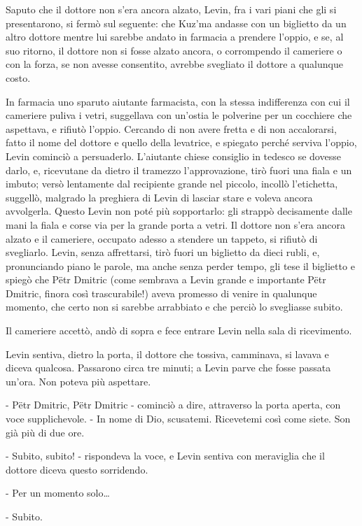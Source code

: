 Saputo che il dottore non s'era ancora alzato, Levin, fra i vari piani che gli si presentarono, si fermò sul seguente: che Kuz'ma andasse con un biglietto da un altro dottore mentre lui sarebbe andato in farmacia a prendere l'oppio, e se, al suo ritorno, il dottore non si fosse alzato ancora, o corrompendo il cameriere o con la forza, se non avesse consentito, avrebbe svegliato il dottore a qualunque costo. 

In farmacia uno sparuto aiutante farmacista, con la stessa indifferenza con cui il cameriere puliva i vetri, suggellava con un'ostia le polverine per un cocchiere che aspettava, e rifiutò l'oppio. Cercando di non avere fretta e di non accalorarsi, fatto il nome del dottore e quello della levatrice, e spiegato perché serviva l'oppio, Levin cominciò a persuaderlo. L'aiutante chiese consiglio in tedesco se dovesse darlo, e, ricevutane da dietro il tramezzo l'approvazione, tirò fuori una fiala e un imbuto; versò lentamente dal recipiente grande nel piccolo, incollò l'etichetta, suggellò, malgrado la preghiera di Levin di lasciar stare e voleva ancora avvolgerla. Questo Levin non poté più sopportarlo: gli strappò decisamente dalle mani la fiala e corse via per la grande porta a vetri. Il dottore non s'era ancora alzato e il cameriere, occupato adesso a stendere un tappeto, si rifiutò di svegliarlo. Levin, senza affrettarsi, tirò fuori un biglietto da dieci rubli, e, pronunciando piano le parole, ma anche senza perder tempo, gli tese il biglietto e spiegò che Pëtr Dmitric (come sembrava a Levin grande e importante Pëtr Dmitric, finora così trascurabile!) aveva promesso di venire in qualunque momento, che certo non si sarebbe arrabbiato e che perciò lo svegliasse subito. 

Il cameriere accettò, andò di sopra e fece entrare Levin nella sala di ricevimento. 

Levin sentiva, dietro la porta, il dottore che tossiva, camminava, si lavava e diceva qualcosa. Passarono circa tre minuti; a Levin parve che fosse passata un'ora. Non poteva più aspettare. 

- Pëtr Dmitric, Pëtr Dmitric - cominciò a dire, attraverso la porta aperta, con voce supplichevole. - In nome di Dio, scusatemi. Ricevetemi così come siete. Son già più di due ore. 

- Subito, subito! - rispondeva la voce, e Levin sentiva con meraviglia che il dottore diceva questo sorridendo. 

- Per un momento solo\ldots{} 

- Subito. 

